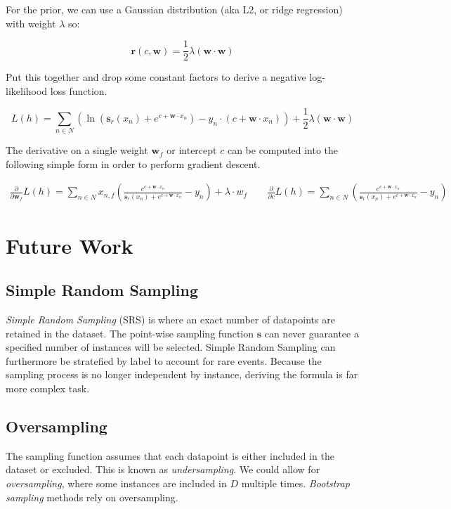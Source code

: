 \documentclass[twoside]{article}
\begin{document}
For the prior, we can use a Gaussian distribution (aka L2, or ridge regression) with weight \(\lambda\) so:

\[\mathbf{r}(c,\mathbf{w})=\frac{1}{2}\lambda(\mathbf{w} \cdot \mathbf{w})\]

Put this together and drop some constant factors to derive a negative log-likelihood loss function.

\[L(h)=\sum_{n \in  N} \left (\ln\left (\mathbf{s}_r(x_n)+e^{c+\mathbf{w} \cdot x_n}\right ) -y_n \cdot (c+\mathbf{w} \cdot x_n) \right )+ \frac{1}{2}\lambda(\mathbf{w} \cdot \mathbf{w})\]

The derivative on a single weight \(\mathbf{w}_f\) or intercept \(c\) can be computed into the following simple form in order to perform gradient descent.

\begin{align}
\frac{\partial}{\partial \mathbf{w}_f }L(h)=\sum_{n \in  N} x_{n,f}\left(\frac{e^{c+\mathbf{w} \cdot x_n}}{\mathbf{s}_r(x_n)+e^{c+\mathbf{w} \cdot x_n}} -y_n  \right )+ \lambda \cdot w_f
\qquad \frac{\partial}{\partial c}L(h)=\sum_{n \in  N} \left(\frac{e^{c+\mathbf{w} \cdot x_n}}{\mathbf{s}_r(x_n)+e^{c+\mathbf{w} \cdot x_n}}  -y_n\right )
\end{align}

\section{Future Work}
\label{section:future_work}

\subsection{Simple Random Sampling}

\textit{Simple Random Sampling} (SRS) is where an exact number of datapoints are retained in the dataset. The point-wise sampling function \(\mathbf{s}\) can never guarantee a specified number of instances will be selected. Simple Random Sampling can furthermore be stratefied by label to account for rare events. Because the sampling process is no longer independent by instance, deriving the formula is far more complex task.

\subsection{Oversampling}

The sampling function assumes that each datapoint is either included in the dataset or excluded. This is known as \textit{undersampling}. We could allow for \textit{oversampling}, where some instances are included in \(D\) multiple times. \textit{Bootstrap sampling} methods rely on oversampling.
\end{document}
